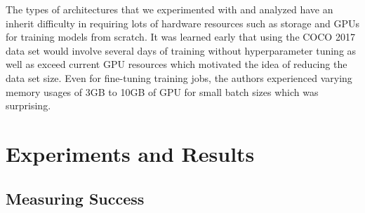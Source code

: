 \documentclass[10pt,twocolumn,letterpaper]{article}
\begin{document}
The types of architectures that we experimented with and analyzed have an inherit difficulty in requiring lots of hardware resources such as storage and GPUs for training models from scratch. It was learned early that using the COCO 2017 data set would involve several days of training without hyperparameter tuning as well as exceed current GPU resources which motivated the idea of reducing the data set size. Even for fine-tuning training jobs, the authors experienced varying memory usages of 3GB to 10GB of GPU for small batch sizes which was surprising.



\section{Experiments and Results}


\subsection{Measuring Success}



\end{document}
